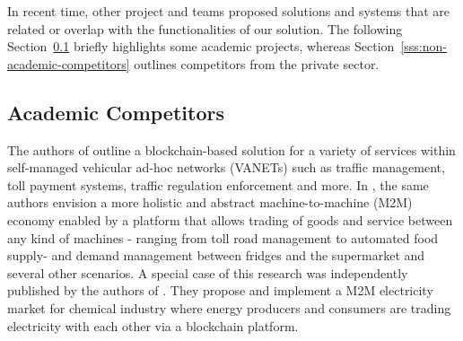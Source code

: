 \documentclass{llncs}
\begin{document}
{		%
		
%							
		
		
			
		In recent time, other project and teams proposed solutions and systems that are related or overlap with the functionalities of our solution. The following Section~\ref{sss:academic-competitors} briefly highlights some academic projects, whereas Section~\ref{sss:non-academic-competitors} outlines competitors from the private sector.


		\subsection{Academic Competitors}
			\label{sss:academic-competitors}
			
			The authors of \cite{leiding2016self} outline a blockchain-based solution for a variety of services within self-managed vehicular ad-hoc networks (VANETs) such as traffic management, toll payment systems, traffic regulation enforcement and more. In \cite{leidingM2M}, the same authors envision a more holistic and abstract machine-to-machine (M2M) economy enabled by a platform that allows trading of goods and service between any kind of machines - ranging from toll road management to automated food  supply- and demand management between fridges and the supermarket and several other scenarios. A special case of this research was independently published by the authors of \cite{sikorski2017blockchain}. They propose and implement a M2M electricity market for chemical industry where energy producers and consumers are trading electricity with each other via a blockchain platform.

}
\end{document}
